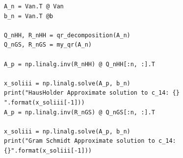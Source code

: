 \begin{solution}
\begin{enumerate}
\begin{lstlisting}
A_n = Van.T @ Van
b_n = Van.T @b

Q_nHH, R_nHH = qr_decomposition(A_n)
Q_nGS, R_nGS = my_qr(A_n)

A_p = np.linalg.inv(R_nHH) @ Q_nHH[:n, :].T

x_soliii = np.linalg.solve(A_p, b_n)
print("HausHolder Approximate solution to c_14: {} ".format(x_soliii[-1]))
A_p = np.linalg.inv(R_nGS) @ Q_nGS[:n, :].T

x_soliii = np.linalg.solve(A_p, b_n)
print("Gram Schmidt Approximate solution to c_14: {}".format(x_soliii[-1]))
\end{lstlisting}
\end{enumerate}
\end{solution}
